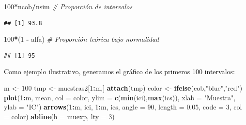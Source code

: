 \documentclass[]{book}
\newenvironment{Shaded}{\begin{snugshade}}{\end{snugshade}}
\newcommand{\KeywordTok}[1]{\textcolor[rgb]{0.13,0.29,0.53}{\textbf{#1}}}
\newcommand{\DataTypeTok}[1]{\textcolor[rgb]{0.13,0.29,0.53}{#1}}
\newcommand{\DecValTok}[1]{\textcolor[rgb]{0.00,0.00,0.81}{#1}}
\newcommand{\FloatTok}[1]{\textcolor[rgb]{0.00,0.00,0.81}{#1}}
\newcommand{\StringTok}[1]{\textcolor[rgb]{0.31,0.60,0.02}{#1}}
\newcommand{\CommentTok}[1]{\textcolor[rgb]{0.56,0.35,0.01}{\textit{#1}}}
\newcommand{\OperatorTok}[1]{\textcolor[rgb]{0.81,0.36,0.00}{\textbf{#1}}}
\newcommand{\NormalTok}[1]{#1}
\theoremstyle{definition}
\theoremstyle{definition}
\theoremstyle{definition}
\theoremstyle{remark}
\begin{document}
\begin{enumerate}
\begin{Shaded}
\begin{Highlighting}[]
\DecValTok{100}\OperatorTok{*}\NormalTok{ncob}\OperatorTok{/}\NormalTok{nsim     }\CommentTok{# Proporción de intervalos}
\end{Highlighting}
\end{Shaded}

\begin{verbatim}
## [1] 93.8
\end{verbatim}

\begin{Shaded}
\begin{Highlighting}[]
\DecValTok{100}\OperatorTok{*}\NormalTok{(}\DecValTok{1} \OperatorTok{-}\StringTok{ }\NormalTok{alfa)    }\CommentTok{# Proporción teórica bajo normalidad}
\end{Highlighting}
\end{Shaded}

\begin{verbatim}
## [1] 95
\end{verbatim}

  Como ejemplo ilustrativo, generamos el gráfico de los primeros 100
  intervalos:

\begin{Shaded}
\begin{Highlighting}[]
\NormalTok{m <-}\StringTok{ }\DecValTok{100}
\NormalTok{tmp <-}\StringTok{ }\NormalTok{muestras2[}\DecValTok{1}\OperatorTok{:}\NormalTok{m,]}
\KeywordTok{attach}\NormalTok{(tmp)}
\NormalTok{color <-}\StringTok{ }\KeywordTok{ifelse}\NormalTok{(cob,}\StringTok{"blue"}\NormalTok{,}\StringTok{"red"}\NormalTok{)}
\KeywordTok{plot}\NormalTok{(}\DecValTok{1}\OperatorTok{:}\NormalTok{m, mean, }\DataTypeTok{col =}\NormalTok{ color, }\DataTypeTok{ylim =} \KeywordTok{c}\NormalTok{(}\KeywordTok{min}\NormalTok{(ici),}\KeywordTok{max}\NormalTok{(ics)), }
     \DataTypeTok{xlab =} \StringTok{"Muestra"}\NormalTok{, }\DataTypeTok{ylab =} \StringTok{"IC"}\NormalTok{)}
\KeywordTok{arrows}\NormalTok{(}\DecValTok{1}\OperatorTok{:}\NormalTok{m, ici, }\DecValTok{1}\OperatorTok{:}\NormalTok{m, ics, }\DataTypeTok{angle =} \DecValTok{90}\NormalTok{, }\DataTypeTok{length =} \FloatTok{0.05}\NormalTok{, }\DataTypeTok{code =} \DecValTok{3}\NormalTok{, }\DataTypeTok{col =}\NormalTok{ color)}
\KeywordTok{abline}\NormalTok{(}\DataTypeTok{h =}\NormalTok{ muexp, }\DataTypeTok{lty =} \DecValTok{3}\NormalTok{)}
\end{Highlighting}
\end{Shaded}


\end{enumerate}
\end{document}
